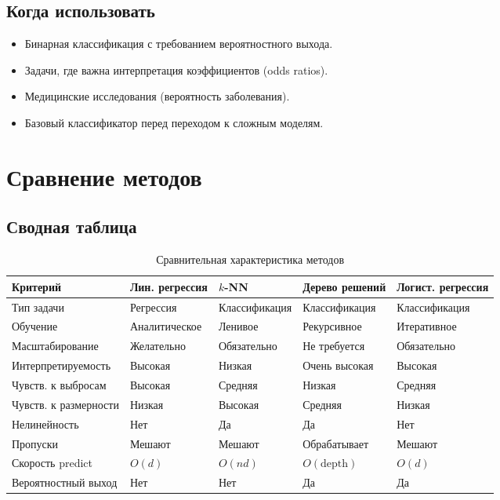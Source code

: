 \documentclass[12pt,a4paper]{article}
\begin{document}
\subsection{Когда использовать}

\begin{itemize}
    \item Бинарная классификация с требованием вероятностного выхода.
    \item Задачи, где важна интерпретация коэффициентов (odds ratios).
    \item Медицинские исследования (вероятность заболевания).
    \item Базовый классификатор перед переходом к сложным моделям.
\end{itemize}

\newpage

\section{Сравнение методов}

\subsection{Сводная таблица}

\begin{table}[H]\centering\small
\caption{Сравнительная характеристика методов}\label{tab:compare}
\begin{tabular}{p{2.5cm}llll}\toprule
Критерий & Лин. регрессия & \(k\)-NN & Дерево решений & Логист. регрессия \\ \midrule
Тип задачи & Регрессия & Классификация & Классификация & Классификация \\
Обучение & Аналитическое & Ленивое & Рекурсивное & Итеративное \\
Масштабирование & Желательно & Обязательно & Не требуется & Обязательно \\
Интерпретируемость & Высокая & Низкая & Очень высокая & Высокая \\
Чувств. к выбросам & Высокая & Средняя & Низкая & Средняя \\
Чувств. к размерности & Низкая & Высокая & Средняя & Низкая \\
Нелинейность & Нет & Да & Да & Нет \\
Пропуски & Мешают & Мешают & Обрабатывает & Мешают \\
Скорость predict & \(O(d)\) & \(O(nd)\) & \(O(\text{depth})\) & \(O(d)\) \\
Вероятностный выход & Нет & Нет & Да & Да \\ \bottomrule
\end{tabular}
\end{table}
\end{document}
